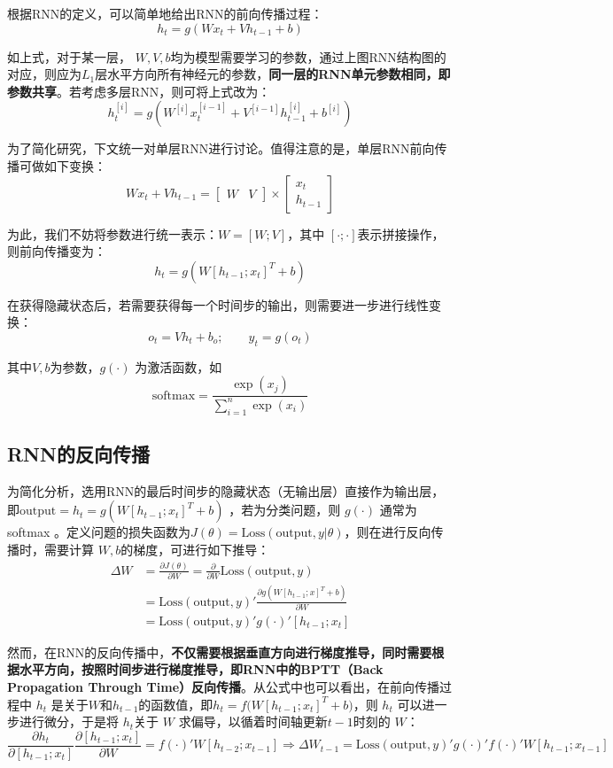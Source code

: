 \documentclass[12pt]{article}
\begin{document}
根据RNN的定义，可以简单地给出RNN的前向传播过程：
$$
h_t = g(Wx_t + Vh_{t-1} + b)
$$

如上式，对于某一层， $W,V,b$均为模型需要学习的参数，通过上图RNN结构图的对应，则应为$L_1$层水平方向所有神经元的参数，\textbf{同一层的RNN单元参数相同，即参数共享}。若考虑多层RNN，则可将上式改为：
$$
h_t^{[i]} = g(W^{[i]}x_t^{[i-1]} + V^{[i-1]}h_{t-1}^{[i]} + b^{[i]})
$$

为了简化研究，下文统一对单层RNN进行讨论。值得注意的是，单层RNN前向传播可做如下变换：
$$
Wx_t + Vh_{t-1} = \begin{bmatrix}
W & V
\end{bmatrix} \times \begin{bmatrix}
x_t \\ h_{t-1}
\end{bmatrix}
$$

为此，我们不妨将参数进行统一表示：$W = [W;V]$，其中 $[\cdot ; \cdot ]$表示拼接操作，则前向传播变为：
$$
h_t = g(W[h_{t-1};x_t]^T + b)
$$

在获得隐藏状态后，若需要获得每一个时间步的输出，则需要进一步进行线性变换：
$$
o_t = Vh_t + b_o; \qquad y_t = g(o_t)
$$

其中$V,b$为参数，$g(\cdot)$ 为激活函数，如
$$
\text{softmax} = \frac{\exp(x_j)}{\sum_{i=1}^n\exp(x_i)}
$$

\subsection{RNN的反向传播}
为简化分析，选用RNN的最后时间步的隐藏状态（无输出层）直接作为输出层，即$\text{output} = h_t = g(W[h_{t-1};x_t]^T+b)$ ，若为分类问题，则 $g(\cdot)$ 通常为 softmax 。定义问题的损失函数为$J(\theta) = \text{Loss}(\text{output}, y|\theta)$，则在进行反向传播时，需要计算 $W,b$的梯度，可进行如下推导：
\begin{align*}
\Delta W &= \frac{\partial J(\theta)}{\partial W}  = \frac{\partial}{\partial W}\text{Loss}(\text{output}, y) \\
	&= \text{Loss}(\text{output}, y)' \frac{\partial g(W[h_{t-1};x]^T+b)}{\partial W} \\
	&= \text{Loss}(\text{output},y)'g(\cdot)'[h_{t-1};x_t]
\end{align*}

然而，在RNN的反向传播中，\textbf{不仅需要根据垂直方向进行梯度推导，同时需要根据水平方向，按照时间步进行梯度推导，即RNN中的BPTT（Back Propagation Through Time）反向传播}。从公式中也可以看出，在前向传播过程中 $h_t$ 是关于$W$和$h_{t-1}$的函数值，即$h_t = f\Big(W[h_{t-1};x_t]^T+b\Big)$，则 $h_t$ 可以进一步进行微分，于是将 $h_t$关于 $W$ 求偏导，以循着时间轴更新$t-1$时刻的 $W$：
$$
\frac{\partial h_t}{\partial [h_{t-1};x_t]}\frac{\partial [h_{t-1};x_t]}{\partial W} = f(\cdot)'W[h_{t-2};x_{t-1}] \Rightarrow \Delta W_{t-1} = \text{Loss}(\text{output},y)'g(\cdot)'f(\cdot)'W[h_{t-1};x_{t-1}]
$$
\end{document}
